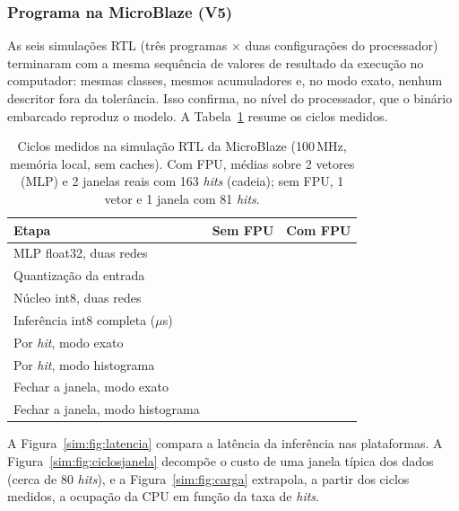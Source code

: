 \subsubsection{Programa na MicroBlaze (V5)}

As seis simulações RTL (três programas \(\times\) duas configurações do processador) terminaram com a mesma sequência de valores de resultado da execução no computador: mesmas classes, mesmos acumuladores e, no modo exato, nenhum descritor fora da tolerância. Isso confirma, no nível do processador, que o binário embarcado reproduz o modelo. A Tabela~\ref{sim:tab:ciclos} resume os ciclos medidos.

\begin{table}[htbp]
	\centering
	\small
	\caption{Ciclos medidos na simulação RTL da MicroBlaze (100\,MHz, memória local, sem caches). Com FPU, médias sobre 2 vetores (MLP) e 2 janelas reais com 163 \textit{hits} (cadeia); sem FPU, 1 vetor e 1 janela com 81 \textit{hits}.}
	\label{sim:tab:ciclos}
	\begin{tabular}{lrr}
		\toprule
		\textbf{Etapa} & \textbf{Sem FPU} & \textbf{Com FPU} \\
		\midrule
		MLP float32, duas redes & \mbMlpFloatSoft & \mbMlpFloatFpu \\
		Quantização da entrada & \mbQuantSoft & \mbQuantFpu \\
		Núcleo int8, duas redes & \mbMlpIntSoft & \mbMlpIntFpu \\
		Inferência int8 completa (\(\mu\)s) & \mbMlpIntSoftUs & \mbMlpIntFpuUs \\
		\midrule
		Por \textit{hit}, modo exato & \mbHitSoft & \mbHitFpu \\
		Por \textit{hit}, modo histograma & \mbHitHistSoft & \mbHitHistFpu \\
		Fechar a janela, modo exato & \mbFecharSoft & \mbFecharFpu \\
		Fechar a janela, modo histograma & \mbFecharHistSoft & \mbFecharHistFpu \\
		\bottomrule
	\end{tabular}
\end{table}

\mbParagrafoMlp

A Figura~\ref{sim:fig:latencia} compara a latência da inferência nas plataformas. A Figura~\ref{sim:fig:ciclosjanela} decompõe o custo de uma janela típica dos dados (cerca de 80 \textit{hits}), e a Figura~\ref{sim:fig:carga} extrapola, a partir dos ciclos medidos, a ocupação da CPU em função da taxa de \textit{hits}.

